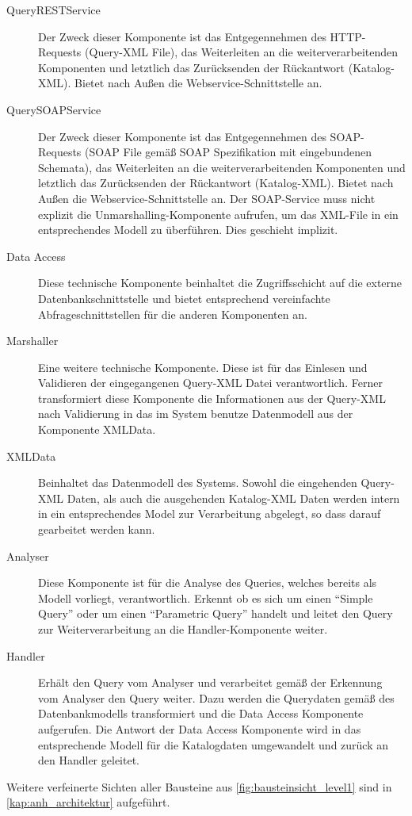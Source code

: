 \begin{description}
\item[QueryRESTService] Der Zweck dieser Komponente ist das Entgegennehmen des HTTP-Requests (Query-XML File), das Weiterleiten an die weiterverarbeitenden Komponenten und letztlich das Zurücksenden der Rückantwort (Katalog-XML). Bietet nach Außen die \gls{Webservice}-Schnittstelle an.
\item[QuerySOAPService] Der Zweck dieser Komponente ist das Entgegennehmen des SOAP-Requests (SOAP File gemäß SOAP Spezifikation mit eingebundenen Schemata), das Weiterleiten an die weiterverarbeitenden Komponenten und letztlich das Zurücksenden der Rückantwort (Katalog-XML). Bietet nach Außen die \gls{Webservice}-Schnittstelle an.
Der SOAP-Service muss nicht explizit die Unmarshalling-Komponente aufrufen, um das XML-File in ein entsprechendes Modell zu überführen. Dies geschieht implizit. 
\item[Data Access] Diese technische Komponente beinhaltet die Zugriffsschicht auf die externe Datenbankschnittstelle und bietet entsprechend vereinfachte Abfrageschnittstellen für die anderen Komponenten an. 
\item[Marshaller] Eine weitere technische Komponente. Diese ist für das Einlesen und Validieren der eingegangenen Query-XML Datei verantwortlich. Ferner transformiert diese Komponente die Informationen aus der Query-XML nach Validierung in das im System benutze Datenmodell aus der Komponente XMLData.
\item[XMLData] Beinhaltet das Datenmodell des Systems. Sowohl die eingehenden Query-XML Daten, als auch die ausgehenden Katalog-XML Daten werden intern in ein entsprechendes Model zur Verarbeitung abgelegt, so dass darauf gearbeitet werden kann.  
\item[Analyser] Diese Komponente ist für die Analyse des Queries, welches bereits als Modell vorliegt, verantwortlich. Erkennt ob es sich um einen \enquote{Simple Query} oder um einen \enquote{Parametric Query} handelt und leitet den Query zur Weiterverarbeitung an die Handler-Komponente weiter. 
\item[Handler] Erhält den Query vom Analyser und verarbeitet gemäß der Erkennung vom Analyser den Query weiter. Dazu werden die Querydaten gemäß des Datenbankmodells transformiert und die Data Access Komponente aufgerufen. Die Antwort der Data Access Komponente wird in das entsprechende Modell für die Katalogdaten umgewandelt und zurück an den Handler geleitet.  
\end{description}

Weitere verfeinerte Sichten aller Bausteine aus \autoref{fig:bausteinsicht_level1} sind in \autoref{kap:anh_architektur} aufgeführt. 
